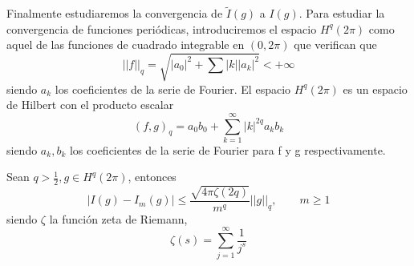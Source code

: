 Finalmente estudiaremos la convergencia de $\widetilde{I}(g)$ a $I(g)$. Para estudiar la convergencia de funciones periódicas, introduciremos el espacio $H^q(2\pi)$ como aquel de las funciones de cuadrado integrable en $(0,2\pi)$ que verifican que 
$$
||f||_q = \sqrt{|a_0|^2+\sum_{}^{}|k||a_k|^2} < +\infty
$$
siendo $a_k$ los coeficientes de la serie de Fourier.
El espacio $H^q(2\pi)$ es un espacio de Hilbert con el producto escalar 
$$ (f,g)_q = a_0b_0 + \sum_{k=1}^{\infty}|k|^{2q} a_kb_k $$ siendo $a_k,b_k$ los coeficientes de la serie de Fourier para f y g respectivamente. 

\begin{thm}Sean $q > \frac{1}{2}, g\in H^q(2\pi)$, entonces
	$$
	| I(g) - I_m(g) | \le \frac{\sqrt{4\pi\zeta(2q)}}{m^q} ||g||_q, \qquad m\ge 1
	$$  
	siendo $\zeta$ la función zeta de Riemann,
	$$\zeta(s) = \sum_{j=1}^{\infty} \frac{1}{j^s}$$
\end{thm}

